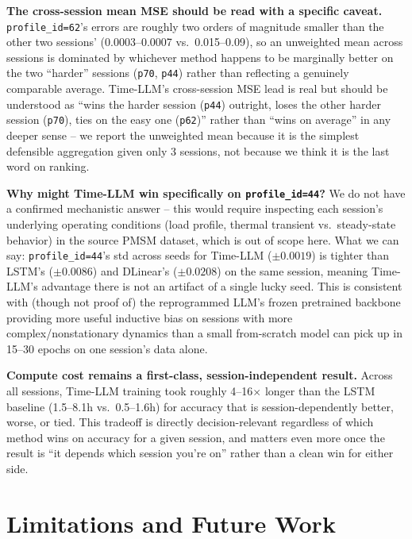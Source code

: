 \documentclass[11pt]{article}
\newcommand{\code}[1]{\texttt{#1}}
\begin{document}
\textbf{The cross-session mean MSE should be read with a specific caveat.}
\code{profile\_id=62}'s errors are roughly two orders of magnitude smaller
than the other two sessions' (0.0003--0.0007 vs.\ 0.015--0.09), so an
unweighted mean across sessions is dominated by whichever method happens to
be marginally better on the two ``harder'' sessions (\code{p70}, \code{p44})
rather than reflecting a genuinely comparable average. Time-LLM's
cross-session MSE lead is real but should be understood as ``wins the
harder session (\code{p44}) outright, loses the other harder session
(\code{p70}), ties on the easy one (\code{p62})'' rather than ``wins on
average'' in any deeper sense -- we report the unweighted mean because it
is the simplest defensible aggregation given only 3 sessions, not because
we think it is the last word on ranking.

\textbf{Why might Time-LLM win specifically on \code{profile\_id=44}?} We
do not have a confirmed mechanistic answer -- this would require inspecting
each session's underlying operating conditions (load profile, thermal
transient vs.\ steady-state behavior) in the source PMSM dataset, which is
out of scope here. What we can say: \code{profile\_id=44}'s std across
seeds for Time-LLM ($\pm 0.0019$) is tighter than LSTM's ($\pm 0.0086$) and
DLinear's ($\pm 0.0208$) on the same session, meaning Time-LLM's advantage
there is not an artifact of a single lucky seed. This is consistent with
(though not proof of) the reprogrammed LLM's frozen pretrained backbone
providing more useful inductive bias on sessions with more
complex/nonstationary dynamics than a small from-scratch model can pick up
in 15--30 epochs on one session's data alone.

\textbf{Compute cost remains a first-class, session-independent result.}
Across all sessions, Time-LLM training took roughly 4--16$\times$ longer
than the LSTM baseline (1.5--8.1h vs.\ 0.5--1.6h) for accuracy that is
session-dependently better, worse, or tied. This tradeoff is directly
decision-relevant regardless of which method wins on accuracy for a given
session, and matters even more once the result is ``it depends which
session you're on'' rather than a clean win for either side.

\section{Limitations and Future Work}
\end{document}
